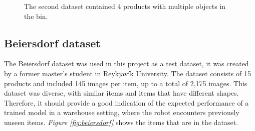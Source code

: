 \begin{figure}[h]
 \hfill
 \hfill
 \hfill
 
 \caption{The second dataset contained 4 products with multiple objects in the bin.}
 \label{figure: multiproducts}
\end{figure}

\subsection{Beiersdorf dataset}\label{sec:beiersdorfdataset}
The Beiersdorf dataset \cite{bjarnason_detecting_2021} was used in this project as a test dataset, it was created by a former master's student in Reykjavík University. 
The dataset consists of 15 products and included 145 images per item, up to a total of 2,175 images. This dataset was diverse, with similar items and items that have different shapes. Therefore, it should provide a good indication of the expected performance of a trained model in a warehouse setting, where the robot encounters previously unseen items. \textit{Figure \ref{fig:beiersdorf}} shows the items that are in the dataset.


